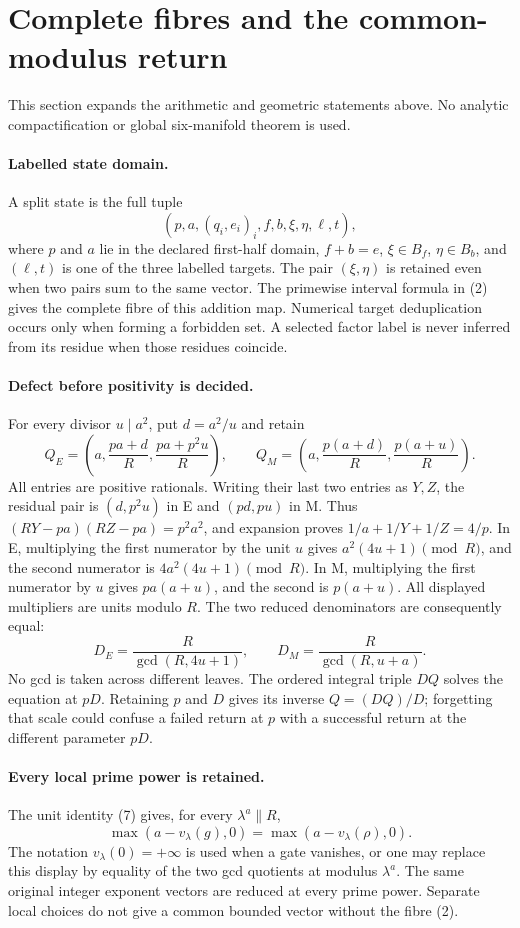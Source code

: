 \section{Complete fibres and the common-modulus return}
This section expands the arithmetic and geometric statements above. No
analytic compactification or global six-manifold theorem is used.

\paragraph{Labelled state domain.}
A split state is the full tuple
\[
(p,a,(q_i,e_i)_i,f,b,\xi,\eta,\ell,t),
\]
where $p$ and $a$ lie in the declared first-half domain, $f+b=e$,
$\xi\in B_f$, $\eta\in B_b$, and $(\ell,t)$ is one of the three
labelled targets. The pair $(\xi,\eta)$ is retained even when two pairs
sum to the same vector. The primewise interval formula in (2) gives the
complete fibre of this addition map. Numerical target deduplication occurs
only when forming a forbidden set. A selected factor label is never inferred
from its residue when those residues coincide.

\paragraph{Defect before positivity is decided.}
For every divisor $u\mid a^2$, put $d=a^2/u$ and retain
\[
 Q_E=\left(a,\frac{pa+d}{R},\frac{pa+p^2u}{R}\right),\qquad
 Q_M=\left(a,\frac{p(a+d)}R,\frac{p(a+u)}R\right).
\]
All entries are positive rationals. Writing their last two entries as
$Y,Z$, the residual pair is $(d,p^2u)$ in E and $(pd,pu)$ in M.
Thus $(RY-pa)(RZ-pa)=p^2a^2$, and expansion proves
$1/a+1/Y+1/Z=4/p$. In E, multiplying the first numerator by the unit $u$
gives $a^2(4u+1)\pmod R$, and the second numerator is
$4a^2(4u+1)\pmod R$. In M, multiplying the first numerator by $u$
gives $pa(a+u)$, and the second is $p(a+u)$. All displayed multipliers
are units modulo $R$. The two reduced denominators are consequently equal:
\[
 D_E=\frac{R}{\gcd(R,4u+1)},\qquad
 D_M=\frac{R}{\gcd(R,u+a)}.
\]
No gcd is taken across different leaves. The ordered integral triple
$DQ$ solves the equation at $pD$. Retaining $p$ and $D$ gives its inverse
$Q=(DQ)/D$; forgetting that scale could confuse a failed return at $p$ with
a successful return at the different parameter $pD$.

\paragraph{Every local prime power is retained.}
The unit identity (7) gives, for every $\lambda^a\parallel R$,
\[
\max(a-v_\lambda(g),0)=\max(a-v_\lambda(\rho),0).
\]
The notation $v_\lambda(0)=+\infty$ is used when a gate vanishes, or
one may replace this display by equality of the two gcd quotients at
modulus $\lambda^a$. The same original integer exponent vectors are
reduced at every prime power. Separate local choices do not give a common
bounded vector without the fibre (2).

